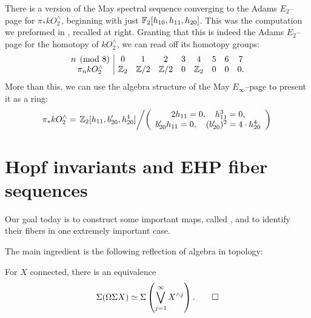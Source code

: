 \begin{remark}
\marginnote{%
\phantom{a}
\printpage[name = MaySSA1, page = 5, y range={0}{8}, x range={0}{10}]
\phantom{b}
}
There is a version of the May spectral sequence converging to the Adams $E_2$--page for $\pi_* kO^\wedge_2$, beginning with just $\mathbb F_2[h_{10}, h_{11}, h_{20}]$.
This was the computation we preformed in , recalled at right.
Granting that this is indeed the Adams $E_2$--page for the homotopy of $kO^\wedge_2$, we can read off its homotopy groups:
\[\begin{array}{c|cccccccc}
n \pmod{8} & 0 & 1 & 2 & 3 & 4 & 5 & 6 & 7 \\
\pi_n kO^\wedge_2 & \mathbb Z_2 & \mathbb Z/2 & \mathbb Z/2 & 0 & \mathbb Z_2 & 0 & 0 & 0.
\end{array}\]
More than this, we can use the algebra structure of the May $E_\infty$--page to present it as a ring: \[\pi_* kO^\wedge_2 = \left. \mathbb Z_2[h_{11}, b_{20}', h_{20}^4] \middle/ \left( \begin{array}{c} 2 h_{11} = 0, \quad h_{11}^3 = 0, \\ b_{20}' h_{11} = 0, \quad (b_{20}')^2 = 4 \cdot h_{20}^4 \end{array} \right) \right. \]
\end{remark}




\section{Hopf invariants and EHP fiber sequences}

Our goal today is to construct some important maps, called , and to identify their fibers in one extremely important case.

The main ingredient is the following reflection of algebra in topology:
\begin{theorem}[James]
For $X$ connected, there is an equivalence
\[\Sigma(\Omega \Sigma X) \simeq \Sigma\left(\bigvee_{j=1}^\infty X^{\wedge j}\right). \qed\]
\end{theorem}

